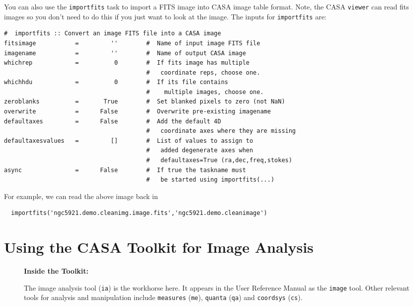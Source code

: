 You can also use the {\tt importfits} task to import a FITS image into
CASA image table format.  Note, the CASA {\tt viewer} can read fits
images so you don't need to do this if you just want to look at the image.  
The inputs for {\tt importfits} are:
\small
\begin{verbatim}
#  importfits :: Convert an image FITS file into a CASA image
fitsimage           =         ''        #  Name of input image FITS file
imagename           =         ''        #  Name of output CASA image
whichrep            =          0        #  If fits image has multiple
                                        #   coordinate reps, choose one.
whichhdu            =          0        #  If its file contains
                                        #    multiple images, choose one.
zeroblanks          =       True        #  Set blanked pixels to zero (not NaN)
overwrite           =      False        #  Overwrite pre-existing imagename
defaultaxes         =      False        #  Add the default 4D
                                        #   coordinate axes where they are missing
defaultaxesvalues   =         []        #  List of values to assign to
                                        #   added degenerate axes when
                                        #   defaultaxes=True (ra,dec,freq,stokes)
async               =      False        #  If true the taskname must
                                        #   be started using importfits(...)
\end{verbatim}
\normalsize
For example, we can read the above image back in
\small
\begin{verbatim}
  importfits('ngc5921.demo.cleanimg.image.fits','ngc5921.demo.cleanimage')
\end{verbatim}
\normalsize

\section{Using the CASA Toolkit for Image Analysis}
\label{section:analysis.toolkit}

\begin{wrapfigure}{r}{2.5in}
  \begin{boxedminipage}{2.5in}
     \centerline{\bf Inside the Toolkit:}
     The image analysis tool ({\tt ia}) is the workhorse here.
     It appears in the User Reference Manual as the {\tt image}
     tool.  Other relevant tools for analysis and manipulation
     include {\tt measures} ({\tt me}), {\tt quanta} ({\tt qa})
     and {\tt coordsys} ({\tt cs}).
  \end{boxedminipage}
\end{wrapfigure}

